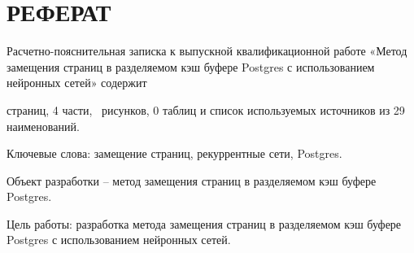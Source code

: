 \setcounter{page}{5}

\chapter*{РЕФЕРАТ}







Расчетно-пояснительная записка к выпускной квалификационной работе «Метод замещения страниц в разделяемом кэш буфере Postgres с использованием нейронных сетей» содержит \begin{NoHyper}\pageref{LastPage}\end{NoHyper}страниц, 4 части, \totfig~рисунков, 0 таблиц и список используемых источников из 29 наименований.

Ключевые слова: замещение страниц, рекуррентные сети, Postgres.
	
Объект разработки -- метод замещения страниц в разделяемом кэш буфере Postgres.

Цель работы: разработка метода замещения страниц в разделяемом кэш буфере Postgres с использованием нейронных сетей. 

